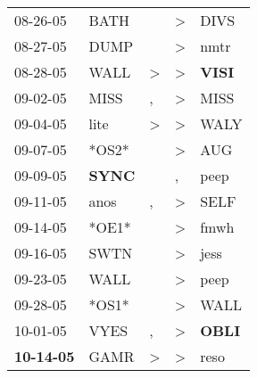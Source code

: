 \begin{supertabular}{p{0.07\textwidth}p{0.06\textwidth}p{0.02\textwidth}p{0.02\textwidth}p{0.06\textwidth}}
          08-26-05\textsuperscript{} &           BATH\textsuperscript{} &                  &     \textgreater &           DIVS\textsuperscript{} \\
          08-27-05\textsuperscript{} &           DUMP\textsuperscript{} &                  &     \textgreater &           nmtr\textsuperscript{} \\
          08-28-05\textsuperscript{} &           WALL\textsuperscript{} &     \textgreater &     \textgreater &  \textbf{VISI\textsuperscript{}} \\
          09-02-05\textsuperscript{} &           MISS\textsuperscript{} &                , &     \textgreater &           MISS\textsuperscript{} \\
          09-04-05\textsuperscript{} &           lite\textsuperscript{} &     \textgreater &     \textgreater &           WALY\textsuperscript{} \\
          09-07-05\textsuperscript{} &                            *OS2* &                  &     \textgreater &            AUG\textsuperscript{} \\
          09-09-05\textsuperscript{} &  \textbf{SYNC\textsuperscript{}} &                  &                , &           peep\textsuperscript{} \\
          09-11-05\textsuperscript{} &           anos\textsuperscript{} &                , &     \textgreater &           SELF\textsuperscript{} \\
          09-14-05\textsuperscript{} &                            *OE1* &                  &     \textgreater &           fmwh\textsuperscript{} \\
          09-16-05\textsuperscript{} &           SWTN\textsuperscript{} &                  &     \textgreater &           jess\textsuperscript{} \\
          09-23-05\textsuperscript{} &           WALL\textsuperscript{} &                  &     \textgreater &           peep\textsuperscript{} \\
          09-28-05\textsuperscript{} &                            *OS1* &                  &     \textgreater &           WALL\textsuperscript{} \\
          10-01-05\textsuperscript{} &           VYES\textsuperscript{} &                , &     \textgreater &  \textbf{OBLI\textsuperscript{}} \\
 \textbf{10-14-05\textsuperscript{}} &           GAMR\textsuperscript{} &     \textgreater &     \textgreater &           reso\textsuperscript{} \\

\end{supertabular}
